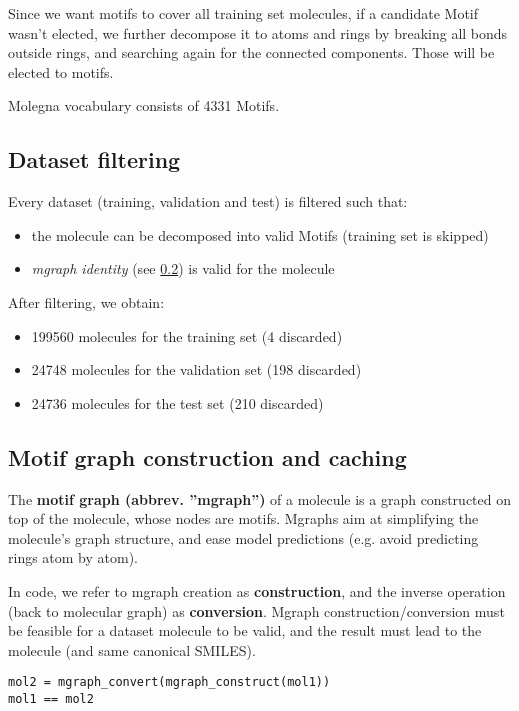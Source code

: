 \documentclass{article}
\begin{document}
Since we want motifs to cover all training set molecules, if a candidate Motif wasn't elected, we further decompose
it to atoms and rings by breaking all bonds outside rings, and searching again for the connected components.
Those will be elected to motifs.

Molegna vocabulary consists of 4331 Motifs.

\subsection{Dataset filtering}

Every dataset (training, validation and test) is filtered such that:
\begin{itemize}
    \item the molecule can be decomposed into valid Motifs (training set is skipped)
    \item \textit{mgraph identity} (see \ref{mgraph_construction_and_caching}) is valid for the molecule
\end{itemize}

After filtering, we obtain:
\begin{itemize}
    \item 199560 molecules for the training set (4 discarded)
    \item 24748 molecules for the validation set (198 discarded)
    \item 24736 molecules for the test set (210 discarded)
\end{itemize}

\subsection{Motif graph construction and caching}
\label{mgraph_construction_and_caching}

The \textbf{motif graph (abbrev. ''mgraph'')} of a molecule is a graph constructed on top of the molecule, whose nodes are motifs.
Mgraphs aim at simplifying the molecule's graph structure, and ease model predictions (e.g. avoid predicting rings atom by atom).

In code, we refer to mgraph creation as \textbf{construction}, and the inverse operation (back to molecular graph) as \textbf{conversion}.
Mgraph construction/conversion must be feasible for a dataset molecule to be valid, and the result must lead to the molecule (and same canonical SMILES).

\begin{lstlisting}[linewidth=\linewidth]
mol2 = mgraph_convert(mgraph_construct(mol1))
mol1 == mol2
\end{lstlisting}
\end{document}
